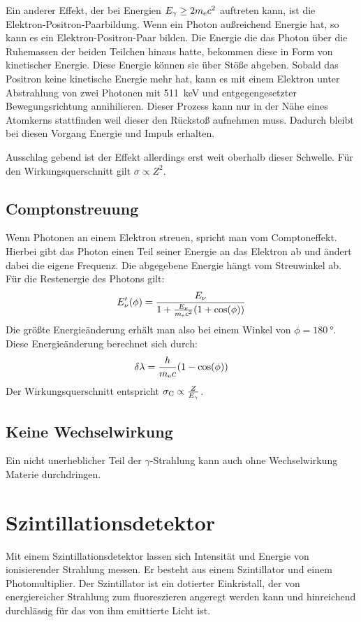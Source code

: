 \documentclass[11pt, ngerman, fleqn, DIV=15, headinclude, BCOR=2cm]{scrreprt}
\begin{document}
Ein anderer Effekt, der bei Energien $E_\gamma \ge 2m_\text ec^2$ auftreten
kann, ist die Elektron-Positron-Paarbildung. Wenn ein Photon außreichend
Energie hat, so kann es ein Elektron-Positron-Paar bilden. Die Energie die das
Photon über die Ruhemassen der beiden Teilchen hinaus hatte, bekommen diese in
Form von kinetischer Energie. Diese Energie können sie über Stöße abgeben.
Sobald das Positron keine kinetische Energie mehr hat, kann es mit einem
Elektron unter Abstrahlung von zwei Photonen mit \SI{511}{\kilo\electronvolt}
und entgegengesetzter Bewegungsrichtung annihilieren. Dieser Prozess kann nur in der Nähe eines Atomkerns stattfinden weil dieser
den Rückstoß aufnehmen muss.
Dadurch bleibt bei diesen Vorgang Energie und Impuls erhalten.

Ausschlag gebend ist der Effekt allerdings erst weit oberhalb dieser Schwelle.
Für den Wirkungsquerschnitt gilt $\sigma \propto Z^2$.

\subsection{Comptonstreuung}
Wenn Photonen an einem Elektron streuen, spricht man vom Comptoneffekt. 
Hierbei gibt das Photon einen Teil seiner Energie an das Elektron ab und ändert dabei
die eigene Frequenz.
Die abgegebene Energie hängt vom Streuwinkel ab.
Für die Restenergie des Photons gilt:
\[
    E_\nu'(\phi) = \frac{E_\nu}{1+\frac{E_\nu}{m_\text ec^2}(1+\cos(\phi))}
\]
Die größte Energieänderung erhält man also bei einem Winkel von
$\phi=\SI{180}{\degree}$.
Diese Energieänderung berechnet sich durch:
\[
    \delta\lambda = \frac{h}{m_\text ec}(1-\cos(\phi))
\]
Der Wirkungsquerschnitt entspricht $\sigma_\text C \propto \frac{Z}{E_\gamma}$.

\subsection{Keine Wechselwirkung}
Ein nicht unerheblicher Teil der $\gamma$-Strahlung kann auch ohne Wechselwirkung
Materie durchdringen.

\section{Szintillationsdetektor}

Mit einem Szintillationsdetektor lassen sich Intensität und Energie von
ionisierender Strahlung messen.
Er besteht aus einem Szintillator und einem Photomultiplier.
Der Szintillator ist ein dotierter Einkristall, der von energiereicher
Strahlung zum fluoreszieren angeregt werden kann und hinreichend
durchlässig für das von ihm emittierte Licht ist.
\end{document}
